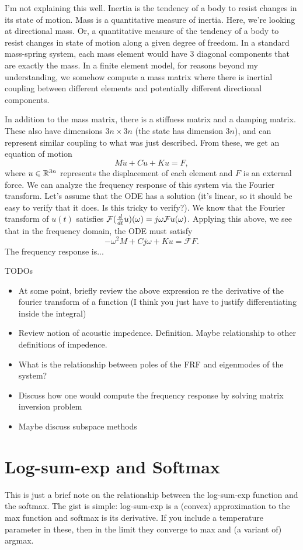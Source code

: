 I'm not explaining this well. Inertia is the tendency of a body to resist changes in its state of motion. Mass is a quantitative measure of inertia. Here, we're looking at directional mass. Or, a quantitative measure of the tendency of a body to resist changes in state of motion along a given degree of freedom. In a standard mass-spring system, each mass element would have 3 diagonal components that are exactly the mass. In a finite element model, for reasons beyond my understanding, we somehow compute a mass matrix where there is inertial coupling between different elements and potentially different directional components. 

In addition to the mass matrix, there is a stiffness matrix and a damping matrix. These also have dimensions $3n\times 3n$ (the state has dimension $3n$), and can represent similar coupling to what was just described. From these, we get an equation of motion
$$
M\ddot u + C\dot u + Ku = F,
$$
where $u\in \mathbb{R}^{3n}$ represents the displacement of each element and $F$ is an external force. 
We can analyze the frequency response of this system via the Fourier transform. Let's assume that the ODE has a solution (it's linear, so it should be easy to verify that it does. Is this tricky to verify?). We know that the Fourier transform of $u(t)$ satisfies $\mathcal{F}(\frac{d}{dt} u)(\omega) = j\omega \mathcal{F}{u}(\omega)$. Applying this above, we see that in the frequency domain, the ODE must satisfy
$$
-\omega^2 M + Cj\omega + Ku = \mathcal{F}{F}.
$$
The frequency response is...

TODOs
\begin{itemize}
  \item At some point, briefly review the above expression re the derivative of the fourier transform of a function (I think you just have to justify differentiating inside the integral)
  \item Review notion of acoustic impedence. Definition. Maybe relationship to other definitions of impedence.  
  \item What is the relationship between poles of the FRF and eigenmodes of the system?
  \item Discuss how one would compute the frequency response by solving matrix inversion problem
  \item Maybe discuss subspace methods
\end{itemize}

\section{Log-sum-exp and Softmax}
This is just a brief note on the relationship between the log-sum-exp function and the softmax. The gist is simple: log-sum-exp is a (convex) approximation to the max function and softmax is its derivative. If you include a temperature parameter in these, then in the limit they converge to max and (a variant of) argmax. 




\section{}

